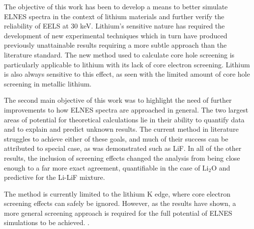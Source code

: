 
The objective of this work has been to develop a means to better simulate ELNES spectra in the context of lithium materials and further verify the reliability of EELS at 30 keV.  Lithium's sensitive nature has required the development of new experimental techniques which in turn have produced previously unattainable results requiring a more subtle approach than the literature standard.  The new method used to calculate core hole screening is particularly applicable to lithium with its lack of core electron screening.  Lithium is also always sensitive to this effect, as seen with the limited amount of core hole screening in metallic lithium.  

The second main objective of this work was to highlight the need of further improvements to how ELNES spectra are approached in general.  The two largest areas of potential for theoretical calculations lie in their ability to quantify data and to explain and predict unknown results.  The current method in literature struggles to achieve either of these goals, and much of their success can be attributed to special case, as was demonstrated such as LiF.  In all of the other results, the inclusion of screening effects changed the analysis from being close enough to a far more exact agreement, quantifiable in the case of $ \mathrm{Li_2O}$ and predictive for the Li-LiF mixture.  

The method is currently limited to the lithium K edge, where core electron screening effects can safely be ignored.  However, as the results have shown, a more general screening approach is required for the full potential of ELNES simulations to be achieved.  .
